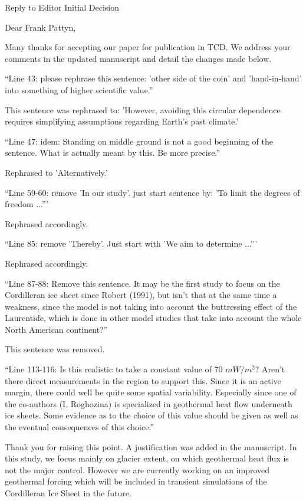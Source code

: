\documentclass{letter}
\newcommand{\rev}[0]{\color{blue!50!black}\it}
\newcommand{\revpoint}[1]{{\rev\item``#1''}}
\begin{document}
\begin{letter}{Reply to Editor Initial Decision}

\opening{Dear Frank Pattyn,}


Many thanks for accepting our paper for publication in TCD. We address your comments in the updated manuscript and detail the changes made below.

\begin{itemize}

\revpoint{Line 43: please rephrase this sentence: 'other side of the coin' and 'hand-in-hand' into something of higher scientific value.}

This sentence was rephrased to: 'However, avoiding this circular dependence requires simplifying assumptions regarding Earth's past climate.'

\revpoint{Line 47: idem: Standing on middle ground is not a good beginning of the sentence. What is actually meant by this. Be more precise.}

Rephrased to 'Alternatively.'

\revpoint{Line 59-60: remove 'In our study'. just start sentence by: 'To limit the degrees of freedom ...'}

Rephrased accordingly.

\revpoint{Line 85: remove 'Thereby'. Just start with 'We aim to determine ...'}

Rephrased accordingly.

\revpoint{Line 87-88: Remove this sentence. It may be the first study to focus on the Cordilleran ice sheet since Robert (1991), but isn't that at the same time a weakness, since the model is not taking into account the buttressing effect of the Laurentide, which is done in other model studies that take into account the whole North American continent?}

This sentence was removed.

\revpoint{Line 113-116: Is this realistic to take a constant value of 70 $mW/m^2$? Aren't there direct measurements in the region to support this. Since it is an active margin, there could well be quite some spatial variability. Especially since one of the co-authors (I. Roghozina) is specialized in geothermal heat flow underneath ice sheets. Some evidence as to the choice of this value should be given as well as the eventual consequences of this choice.}

Thank you for raising this point. A justification was added in the manuscript. In this study, we focus mainly on glacier extent, on which geothermal heat flux is not the major control. However we are currently working on an improved geothermal forcing which will be included in transient simulations of the Cordilleran Ice Sheet in the future.


\end{itemize}
\end{letter}
\end{document}
